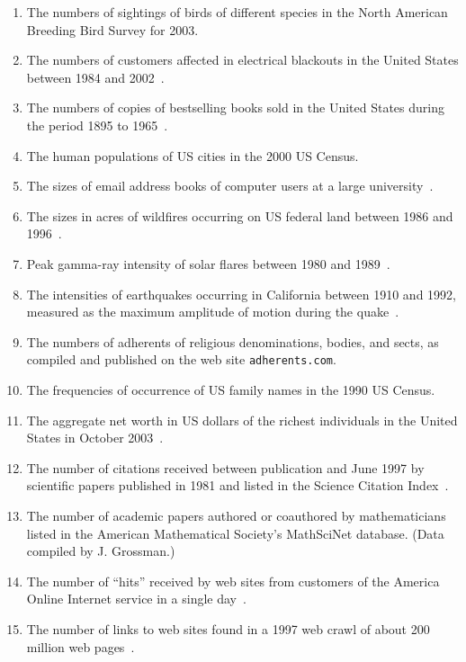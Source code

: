 \documentclass[final]{siamltex}
\begin{document}
\begin{enumerate}
 in this context means the last few tens of thousands of years.
\item The numbers of sightings of birds of different species in the North
 American Breeding Bird Survey for 2003.
\item The numbers of customers affected in electrical blackouts in the
 United States between 1984 and 2002~\cite{MEJN-on-power-laws}.
\item The numbers of copies of bestselling books sold in the United States
 during the period 1895 to 1965~\cite{Hackett67}.
\item The human populations of US cities in the 2000 US Census.
\item The sizes of email address books of computer users at a large
 university~\cite{NFB02}.
\item The sizes in acres of wildfires occurring on US federal land between
 1986 and 1996~\cite{MEJN-on-power-laws}.
\item Peak gamma-ray intensity of solar flares between 1980 and
 1989~\cite{MEJN-on-power-laws}.
\item The intensities of earthquakes occurring in California between 1910
 and 1992, measured as the maximum amplitude of motion during the
 quake~\cite{MEJN-on-power-laws}.
\item The numbers of adherents of religious denominations, bodies, and
 sects, as compiled and published on the web site {\tt adherents.com}.
\item The frequencies of occurrence of US family names in the 1990 US
 Census.
\item The aggregate net worth in US dollars of the richest individuals in
 the United States in October 2003~\cite{MEJN-on-power-laws}.
\item The number of citations received between publication and June 1997 by
 scientific papers published in 1981 and listed in the Science Citation
 Index~\cite{Redner-how-popular}.
\item The number of academic papers authored or coauthored by
 mathematicians listed in the American Mathematical Society's MathSciNet
 database.  (Data compiled by J. Grossman.)
\item The number of ``hits'' received by web sites from customers of the
 America Online Internet service in a single day~\cite{AH00b}.
\item The number of links to web sites found in a 1997 web crawl of about
 200 million web pages~\cite{Broder00}.
\end{enumerate}
\end{document}
